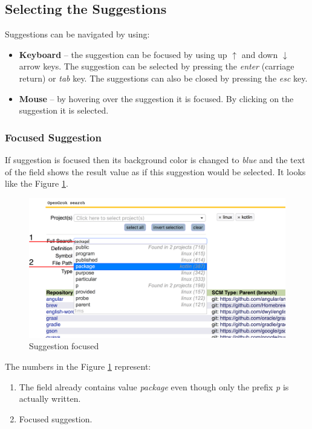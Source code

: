 \subsection{Selecting the Suggestions}
Suggestions can be navigated by using:
\begin {itemize}
    \item \textbf{Keyboard} – the suggestion can be focused by using up $\uparrow$ and down $\downarrow$ arrow keys.
    The suggestion can be selected by pressing the \textit{enter} (carriage return) or \textit{tab} key.
    The suggestions can also be closed by pressing the \textit{esc} key.
    \item \textbf{Mouse} – by hovering over the suggestion it is focused. By clicking on the suggestion it
    is selected.
\end{itemize}

\subsubsection{Focused Suggestion}
If suggestion is focused then its background color is changed to \textit{blue} and the text of the field shows the result
value as if this suggestion would be selected. It looks like the Figure \ref{suggestion_focused}.

\begin{figure}[htbp]
    \centering
    \includegraphics[width=145mm]{../img/suggestions_focused.png}
    \caption{Suggestion focused}
    \label{suggestion_focused}
\end{figure}

The numbers in the Figure \ref{suggestion_focused} represent:
\begin{enumerate}
    \item The field already contains value \textit{package} even though only the prefix \textit{p} is actually written.
    \item Focused suggestion.
\end{enumerate}

